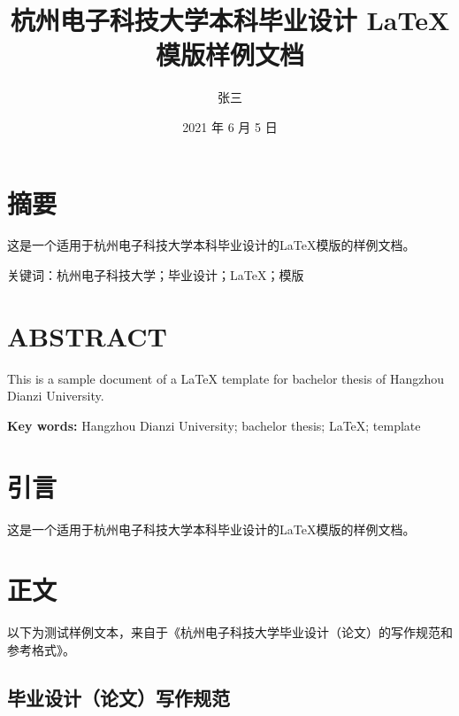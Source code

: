 \documentclass{HDU-Bachelor-Thesis}
\title{杭州电子科技大学本科毕业设计 \LaTeX{} 模版样例文档}
\author{张三}
\date{2021 年 6 月 5 日}
\begin{document}
\pagestyle{empty}

\maketitle
%

\clearpage
\pagestyle{HDU-bachelor-empty}

\section*{摘\hspace{2em}要}

这是一个适用于杭州电子科技大学本科毕业设计的\LaTeX{}模版的样例文档。

\vspace{\baselineskip}\noindent
\textsf{关键词：}杭州电子科技大学；毕业设计；\LaTeX；模版

\clearpage
\section*{\textbf{ABSTRACT}}

This is a sample document of a \LaTeX{} template for bachelor thesis of Hangzhou Dianzi University.

\vspace{\baselineskip}\noindent
\textbf{Key words:} Hangzhou Dianzi University; bachelor thesis; \LaTeX; template

\clearpage
\tableofcontents

\clearpage
\pagestyle{HDU-bachelor}

\section{引言}

这是一个适用于杭州电子科技大学本科毕业设计的\LaTeX\cite{lamport1994latex}模版的样例文档。

\clearpage
\section{正文}

以下为测试样例文本，来自于《杭州电子科技大学毕业设计（论文）的写作规范和参考格式》。

\subsection{毕业设计（论文）写作规范}
\end{document}
